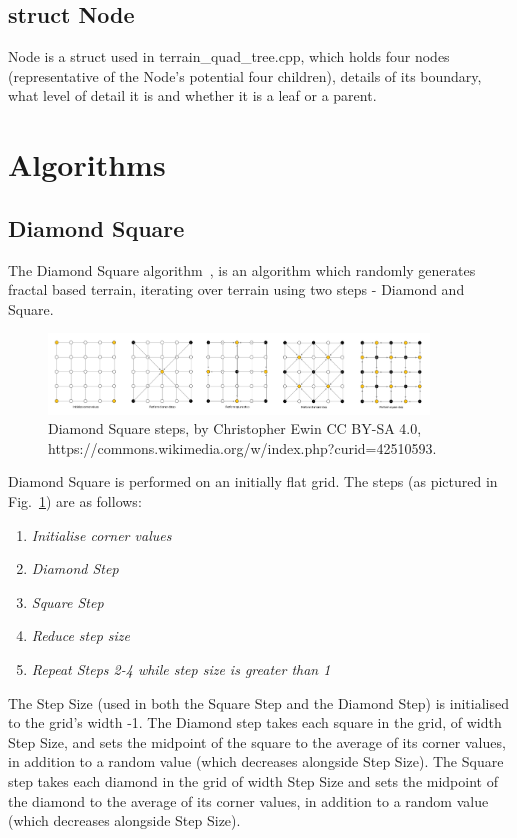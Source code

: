 \documentclass[a4paper,10pt]{report}
\begin{document}
\subsection{struct Node}
Node is a struct used in terrain\_quad\_tree.cpp, which holds four nodes (representative of the Node's potential four children), details of its boundary, what level of detail it is and whether it is a leaf or a parent.


\clearpage

\section{Algorithms}
\subsection{Diamond Square}
The Diamond Square algorithm~\cite{miller1986definition}, is an algorithm which randomly generates fractal based terrain, iterating over terrain using two steps - Diamond and Square. \medskip 

\begin{figure}[h!]
    \centering
  \includegraphics[width=0.9\textwidth]{Images/External/Diamond_Square.png}
 \caption[Diamond Square steps, by Christopher Ewin]{Diamond Square steps, by Christopher Ewin CC BY-SA 4.0, https://commons.wikimedia.org/w/index.php?curid=42510593.}
 \label{fig:diamond_square_steps}
\end{figure} 

Diamond Square is performed on an initially flat grid. The steps (as pictured in Fig.~\ref{fig:diamond_square_steps}) are as follows:

\begin{enumerate}
\item \textit{Initialise corner values}
\item \textit{Diamond Step}
\item \textit{Square Step}
\item \textit{Reduce step size} 
\item \textit{Repeat Steps 2-4 while step size is greater than 1}
\end{enumerate} 

The Step Size (used in both the Square Step and the Diamond Step) is initialised to the grid's width -1. The Diamond step takes each square in the grid, of width Step Size, and sets the midpoint of the square to the average of its corner values, in addition to a random value (which decreases alongside Step Size). The Square step takes each diamond in the grid of width Step Size and sets the midpoint of the diamond to the average of its corner values, in addition to a random value (which decreases alongside Step Size). \medskip
\end{document}
